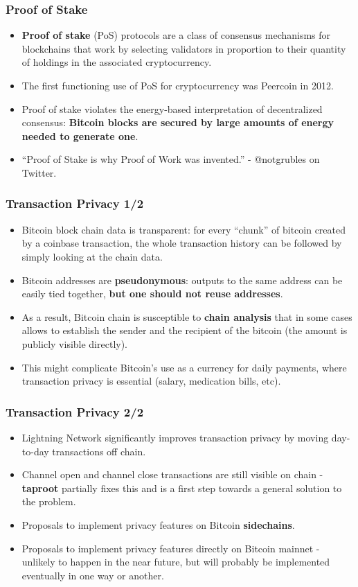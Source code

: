 \documentclass{beamer}
\begin{document}
\begin{frame}
  \frametitle{Proof of Stake}
  \begin{itemize}
  \item \textbf{Proof of stake} (PoS) protocols are a class of consensus
    mechanisms for blockchains that work by selecting validators in proportion
    to their quantity of holdings in the associated cryptocurrency.
  \item The first functioning use of PoS for cryptocurrency was Peercoin in
    2012.
  \item Proof of stake violates the energy-based interpretation of decentralized
    consensus: \textbf{Bitcoin blocks are secured by large amounts of energy
      needed to generate one}.
  \item ``Proof of Stake is why Proof of Work was invented.'' - @notgrubles on
    Twitter.
  \end{itemize}
\end{frame}

\begin{frame}
  \frametitle{Transaction Privacy 1/2}
  \begin{itemize}
  \item Bitcoin block chain data is transparent: for every ``chunk'' of bitcoin
    created by a coinbase transaction, the whole transaction history can be
    followed by simply looking at the chain data.
  \item Bitcoin addresses are \textbf{pseudonymous}: outputs to the same address
    can be easily tied together, \textbf{but one should not reuse addresses}.
  \item As a result, Bitcoin chain is susceptible to \textbf{chain analysis}
    that in some cases allows to establish the sender and the recipient of the
    bitcoin (the amount is publicly visible directly).
  \item This might complicate Bitcoin's use as a currency for daily payments,
    where transaction privacy is essential (salary, medication bills, etc).
  \end{itemize}
\end{frame}

\begin{frame}
  \frametitle{Transaction Privacy 2/2}
  \begin{itemize}
  \item Lightning Network significantly improves transaction privacy by moving
    day-to-day transactions off chain.
  \item Channel open and channel close transactions are still visible on chain -
    \textbf{taproot} partially fixes this and is a first step towards a general
    solution to the problem.
  \item Proposals to implement privacy features on Bitcoin \textbf{sidechains}.
  \item Proposals to implement privacy features directly on Bitcoin mainnet -
    unlikely to happen in the near future, but will probably be implemented
    eventually in one way or another.
  \end{itemize}
\end{frame}
\end{document}

